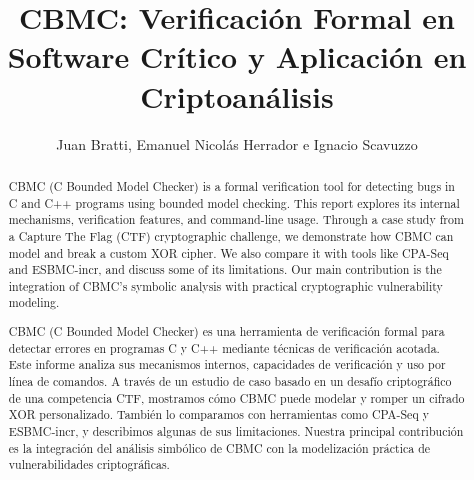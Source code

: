 \documentclass[runningheads]{llncs}
\begin{document}
%
\title{CBMC: Verificación Formal en Software Crítico y Aplicación en Criptoanálisis}

%
\author{
  Juan Bratti, 
  Emanuel Nicolás Herrador e
  Ignacio Scavuzzo
}


\maketitle

%
\renewcommand{\abstractname}{Abstract}
\begin{abstract}
  CBMC (C Bounded Model Checker) is a formal verification tool for detecting bugs in C and C++ programs using bounded model checking.
  This report explores its internal mechanisms, verification features, and command-line usage. 
  Through a case study from a Capture The Flag (CTF) cryptographic challenge, we demonstrate how CBMC can model and break a custom XOR cipher.
  We also compare it with tools like CPA-Seq and ESBMC-incr, and discuss some of its limitations.
  Our main contribution is the integration of CBMC’s symbolic analysis with practical cryptographic vulnerability modeling.

\end{abstract}

\renewcommand{\abstractname}{Resumen}
\begin{abstract}
  CBMC (C Bounded Model Checker) es una herramienta de verificación formal para detectar errores en programas C y C++ mediante técnicas de verificación acotada.
  Este informe analiza sus mecanismos internos, capacidades de verificación y uso por línea de comandos.
  A través de un estudio de caso basado en un desafío criptográfico de una competencia CTF, mostramos cómo CBMC puede modelar y romper un cifrado XOR personalizado.
  También lo comparamos con herramientas como CPA-Seq y ESBMC-incr, y describimos algunas de sus limitaciones.
  Nuestra principal contribución es la integración del análisis simbólico de CBMC con la modelización práctica de vulnerabilidades criptográficas.
\end{abstract}
\end{document}
